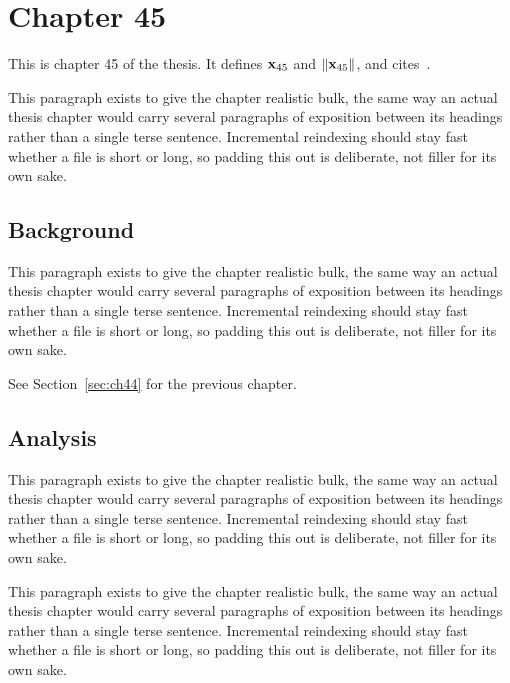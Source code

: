 \section{Chapter 45}
\label{sec:ch45}

This is chapter 45 of the thesis. It defines $\mathbf{x}_{45}$ and $\lVert \mathbf{x}_{45} \rVert$, and cites~\cite{ref1}.

This paragraph exists to give the chapter realistic bulk, the same way an actual thesis chapter would carry several paragraphs of exposition between its headings rather than a single terse sentence. Incremental reindexing should stay fast whether a file is short or long, so padding this out is deliberate, not filler for its own sake.

\subsection{Background}
\label{sec:ch45:background}

This paragraph exists to give the chapter realistic bulk, the same way an actual thesis chapter would carry several paragraphs of exposition between its headings rather than a single terse sentence. Incremental reindexing should stay fast whether a file is short or long, so padding this out is deliberate, not filler for its own sake.

See Section~\ref{sec:ch44} for the previous chapter.

\subsection{Analysis}
\label{sec:ch45:analysis}

This paragraph exists to give the chapter realistic bulk, the same way an actual thesis chapter would carry several paragraphs of exposition between its headings rather than a single terse sentence. Incremental reindexing should stay fast whether a file is short or long, so padding this out is deliberate, not filler for its own sake.

This paragraph exists to give the chapter realistic bulk, the same way an actual thesis chapter would carry several paragraphs of exposition between its headings rather than a single terse sentence. Incremental reindexing should stay fast whether a file is short or long, so padding this out is deliberate, not filler for its own sake.
